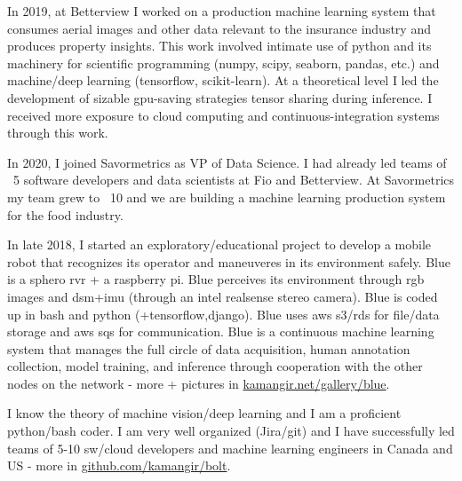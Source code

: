 \osspacing
In 2019, at Betterview I worked on a production machine learning system that consumes aerial images and other data relevant to the insurance industry and produces property insights. This work involved intimate use of python and its machinery for scientific programming (numpy, scipy, seaborn, pandas, etc.) and machine/deep learning (tensorflow, scikit-learn). At a theoretical level I led the development of sizable gpu-saving strategies tensor sharing during inference. I received more exposure to cloud computing and continuous-integration systems through this work.

\osspacing
In 2020, I joined Savormetrics as VP of Data Science. I had already led teams of ~5 software developers and data scientists at Fio and Betterview. At Savormetrics my team grew to ~10 and we are building a machine learning production system for the food industry.

\osspacing
In late 2018, I started an exploratory/educational project to develop a mobile robot that recognizes its operator and maneuveres in its environment safely. Blue is a sphero rvr + a raspberry pi. Blue perceives its environment through rgb images and dsm+imu (through an intel realsense stereo camera). Blue is coded up in bash and python (+tensorflow,django). Blue uses aws s3/rds for file/data storage and aws sqs for communication. Blue is a continuous machine learning system that manages the full circle of data acquisition, human annotation collection, model training, and inference through cooperation with the other nodes on the network - more + pictures in \href{http://kamangir.net/gallery/blue}{kamangir.net/gallery/blue}.

\osspacing
I know the theory of machine vision/deep learning and I am a proficient python/bash coder. I am very well organized (Jira/git) and I have successfully led teams of 5-10 sw/cloud developers and machine learning engineers in Canada and US - more in \href{https://github.com/kamangir/bolt}{github.com/kamangir/bolt}.

